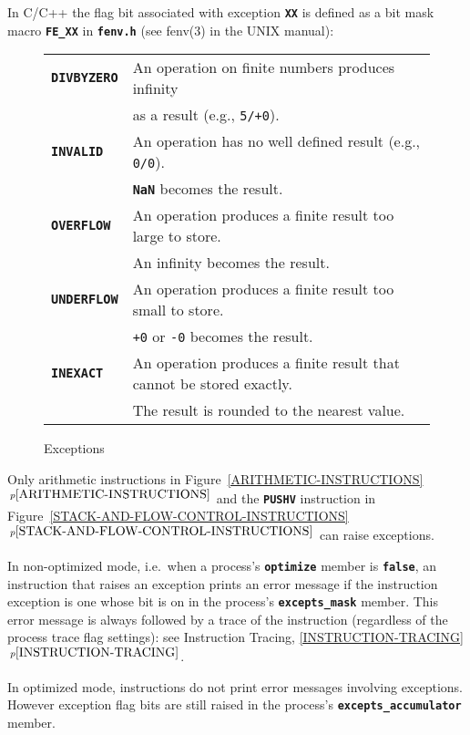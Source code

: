 \documentclass[12pt]{article}
\makeatletter
\newcommand{\TT}[1]{{\tt \bfseries #1}}
\newcommand{\ttkey}[1]{\TT{#1}\index{#1@{\tt #1}}}
\newcommand{\itemref}[1]{\ref{#1}$\,^{p\pageref{#1}}$}
\newlength{\figurewidth}
\newenvironment{boxedfigure}[1][!btp]%
	{\begin{figure*}[#1]
	 \begin{lrbox}{\figurebox}
	 \begin{minipage}{\figurewidth}

	 \vspace*{1ex}}%
	{
	 \vspace*{1ex}

	 \end{minipage}
	 \end{lrbox}

	 \centering
	 \fbox{\hspace*{0.1in}\usebox{\figurebox}\hspace*{0.1in}}
	 \end{figure*}}
\makeatother
\begin{document}
In C/C++ the flag bit associated with exception \TT{XX}
is defined as a bit mask macro \TT{FE\_XX} in \TT{fenv.h}
(see fenv(3) in the UNIX manual):

\begin{boxedfigure}[b!]
\begin{center}
\begin{tabular}{|l|l|}
\hline
\ttkey{DIVBYZERO} &  An operation on finite numbers produces infinity \\
                  &  as a result (e.g., {\tt 5/+0}).
\\\hline
\ttkey{INVALID} & An operation has no well defined result
                  (e.g., {\tt 0/0}). \\
		& \TT{NaN} becomes the result.
\\\hline
\ttkey{OVERFLOW} & An operation produces a finite result too large to
                   store. \\
		 & An infinity becomes the result.
\\\hline
\ttkey{UNDERFLOW} & An operation produces a finite result too small to
                    store. \\
	          & {\tt +0} or {\tt -0} becomes the result.
\\\hline
\ttkey{INEXACT} & An operation produces a finite result that cannot
                  be stored exactly. \\
		& The result is rounded to the nearest value.
\\\hline
\end{tabular}
\end{center}
\caption{Exceptions}
\label{EXCEPTIONS}
\end{boxedfigure}

Only arithmetic instructions in Figure~\itemref{ARITHMETIC-INSTRUCTIONS}
and the \TT{PUSHV} instruction in
Figure~\itemref{STACK-AND-FLOW-CONTROL-INSTRUCTIONS} can raise
exceptions.

In non-optimized mode, i.e.~when a process's \TT{optimize} member is \TT{false},
an instruction that raises an exception prints
an error message if the instruction exception is one whose bit
is on in the process's \TT{excepts\_mask} member.
This error message is always followed by a trace of the instruction
(regardless of the process trace flag settings): see
Instruction Tracing, \itemref{INSTRUCTION-TRACING}.

In optimized mode, instructions do not print error messages
involving exceptions.  However exception flag bits are still
raised in the process's \TT{excepts\_accumulator} member.
\end{document}
